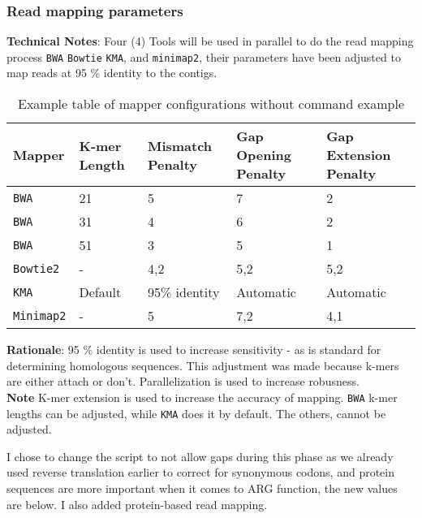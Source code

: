 \documentclass[11pt]{report}
\begin{document}
\subsubsection{Read mapping parameters}
\textbf{Technical Notes}: Four (4) Tools will be used in parallel to do the read mapping process \texttt{BWA} \texttt{Bowtie} \texttt{KMA}, and \texttt{minimap2}, their parameters have been adjusted to map reads at 95 \% identity to the contigs.
	
\begin{table}[h!]
	\centering
	\begin{adjustbox}{max width=\linewidth}
		\begin{tabular}{|p{3cm}|p{3cm}|p{3cm}|p{3cm}|p{3cm}|}
			\hline
			\textbf{Mapper} & \textbf{K-mer Length} & \textbf{Mismatch Penalty} & \textbf{Gap Opening Penalty} & \textbf{Gap Extension Penalty} \\ \hline
			\texttt{BWA} & 21 & 5 & 7 & 2 \\ \hline
			\texttt{BWA} & 31 & 4 & 6 & 2 \\ \hline
			\texttt{BWA} & 51 & 3 & 5 & 1 \\ \hline
			\texttt{Bowtie2} & - & 4,2 & 5,2 & 5,2 \\ \hline
			\texttt{KMA} & Default & 95\% identity & Automatic & Automatic \\ \hline
			\texttt{Minimap2} & - & 5 & 7,2 & 4,1 \\ \hline
		\end{tabular}
	\end{adjustbox}
	\caption{Example table of mapper configurations without command example}
	\label{tab:mapper_configurations}
\end{table} 
\textbf{Rationale}: 95 \% identity is used to increase sensitivity - as is standard for determining homologous sequences. This adjustment was made because k-mers are either attach or don't. Parallelization is used to increase robusness.\\
\textbf{Note} K-mer extension is used to increase the accuracy of mapping. \texttt{BWA} k-mer lengths can be adjusted, while \texttt{KMA} does it by default. The others, cannot be adjusted. \\

	\begin{tcolorbox}[title=Note, coltitle=white]
		I chose to change the script to not allow gaps during this phase as we already used reverse translation earlier to correct for synonymous codons, and protein sequences are more important when it comes to ARG function, the new values are below. I also added protein-based read mapping. 
	\end{tcolorbox}
\end{document}
